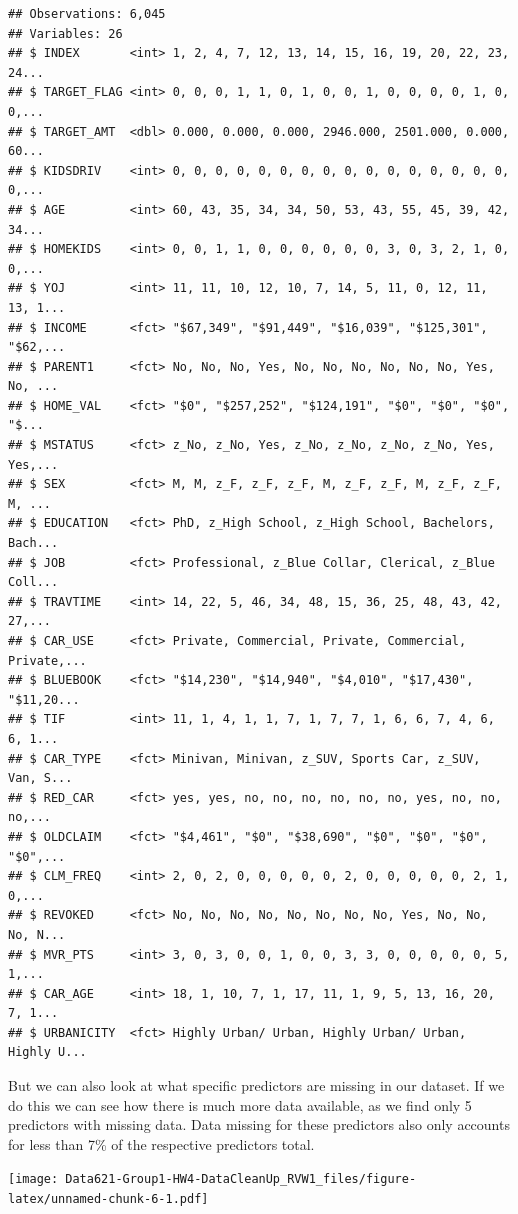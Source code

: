 \documentclass[]{article}
\begin{document}
\begin{verbatim}
## Observations: 6,045
## Variables: 26
## $ INDEX       <int> 1, 2, 4, 7, 12, 13, 14, 15, 16, 19, 20, 22, 23, 24...
## $ TARGET_FLAG <int> 0, 0, 0, 1, 1, 0, 1, 0, 0, 1, 0, 0, 0, 0, 1, 0, 0,...
## $ TARGET_AMT  <dbl> 0.000, 0.000, 0.000, 2946.000, 2501.000, 0.000, 60...
## $ KIDSDRIV    <int> 0, 0, 0, 0, 0, 0, 0, 0, 0, 0, 0, 0, 0, 0, 0, 0, 0,...
## $ AGE         <int> 60, 43, 35, 34, 34, 50, 53, 43, 55, 45, 39, 42, 34...
## $ HOMEKIDS    <int> 0, 0, 1, 1, 0, 0, 0, 0, 0, 0, 3, 0, 3, 2, 1, 0, 0,...
## $ YOJ         <int> 11, 11, 10, 12, 10, 7, 14, 5, 11, 0, 12, 11, 13, 1...
## $ INCOME      <fct> "$67,349", "$91,449", "$16,039", "$125,301", "$62,...
## $ PARENT1     <fct> No, No, No, Yes, No, No, No, No, No, No, Yes, No, ...
## $ HOME_VAL    <fct> "$0", "$257,252", "$124,191", "$0", "$0", "$0", "$...
## $ MSTATUS     <fct> z_No, z_No, Yes, z_No, z_No, z_No, z_No, Yes, Yes,...
## $ SEX         <fct> M, M, z_F, z_F, z_F, M, z_F, z_F, M, z_F, z_F, M, ...
## $ EDUCATION   <fct> PhD, z_High School, z_High School, Bachelors, Bach...
## $ JOB         <fct> Professional, z_Blue Collar, Clerical, z_Blue Coll...
## $ TRAVTIME    <int> 14, 22, 5, 46, 34, 48, 15, 36, 25, 48, 43, 42, 27,...
## $ CAR_USE     <fct> Private, Commercial, Private, Commercial, Private,...
## $ BLUEBOOK    <fct> "$14,230", "$14,940", "$4,010", "$17,430", "$11,20...
## $ TIF         <int> 11, 1, 4, 1, 1, 7, 1, 7, 7, 1, 6, 6, 7, 4, 6, 6, 1...
## $ CAR_TYPE    <fct> Minivan, Minivan, z_SUV, Sports Car, z_SUV, Van, S...
## $ RED_CAR     <fct> yes, yes, no, no, no, no, no, no, yes, no, no, no,...
## $ OLDCLAIM    <fct> "$4,461", "$0", "$38,690", "$0", "$0", "$0", "$0",...
## $ CLM_FREQ    <int> 2, 0, 2, 0, 0, 0, 0, 0, 2, 0, 0, 0, 0, 0, 2, 1, 0,...
## $ REVOKED     <fct> No, No, No, No, No, No, No, No, Yes, No, No, No, N...
## $ MVR_PTS     <int> 3, 0, 3, 0, 0, 1, 0, 0, 3, 3, 0, 0, 0, 0, 0, 5, 1,...
## $ CAR_AGE     <int> 18, 1, 10, 7, 1, 17, 11, 1, 9, 5, 13, 16, 20, 7, 1...
## $ URBANICITY  <fct> Highly Urban/ Urban, Highly Urban/ Urban, Highly U...
\end{verbatim}

But we can also look at what specific predictors are missing in our
dataset. If we do this we can see how there is much more data available,
as we find only 5 predictors with missing data. Data missing for these
predictors also only accounts for less than 7\% of the respective
predictors total.

\texttt{[image: Data621-Group1-HW4-DataCleanUp\_RVW1\_files/figure-latex/unnamed-chunk-6-1.pdf]}
\end{document}
